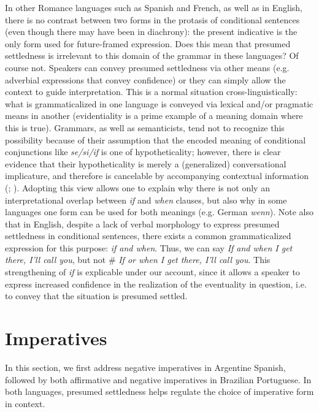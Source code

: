 \documentclass[output=paper,colorlinks,citecolor=brown]{langscibook}
\begin{document}
In other Romance languages such as Spanish and French, as well as in English, there is no contrast between two forms in the protasis of conditional sentences (even though there may have been in diachrony): the present indicative is the only form used for future-framed expression. Does this mean that presumed settledness is irrelevant to this domain of the grammar in these languages? Of course not. Speakers can convey presumed settledness via other means (e.g. adverbial expressions that convey confidence) or they can simply allow the context to guide interpretation. This is a normal situation cross-linguistically: what is grammaticalized in one language is conveyed via lexical and/or pragmatic means in another (evidentiality is a prime example of a meaning domain where this is true). Grammars, as well as semanticists, tend not to recognize this possibility because of their assumption that the encoded meaning of conditional conjunctions like \textit{se/si/if} is one of hypotheticality; however, there is clear evidence that their hypotheticality is merely a (generalized) conversational implicature, and therefore is cancelable by accompanying contextual information (\citealt{Schwenter1999}; \citealt{Levinson2000}). Adopting this view allows one to explain why there is not only an interpretational overlap between \textit{if} and \textit{when} clauses, but also why in some languages one form can be used for both meanings (e.g. German \textit{wenn}). Note also that in English, despite a lack of verbal morphology to express presumed settledness in conditional sentences, there exists a common grammaticalized expression for this purpose: \textit{if and when}. Thus, we can say \textit{If and when I get there, I’ll call you}, but not \# \textit{If or when I get there, I’ll call you}. This strengthening of \textit{if} is explicable under our account, since it allows a speaker to express increased confidence in the realization of the eventuality in question, i.e. to convey that the situation is presumed settled.

\section{Imperatives}\label{sec:hoff:Imperatives}

In this section, we first address negative imperatives in Argentine Spanish, followed by both affirmative and negative imperatives in Brazilian Portuguese. In both languages, presumed settledness helps regulate the choice of imperative form in context.
\end{document}
